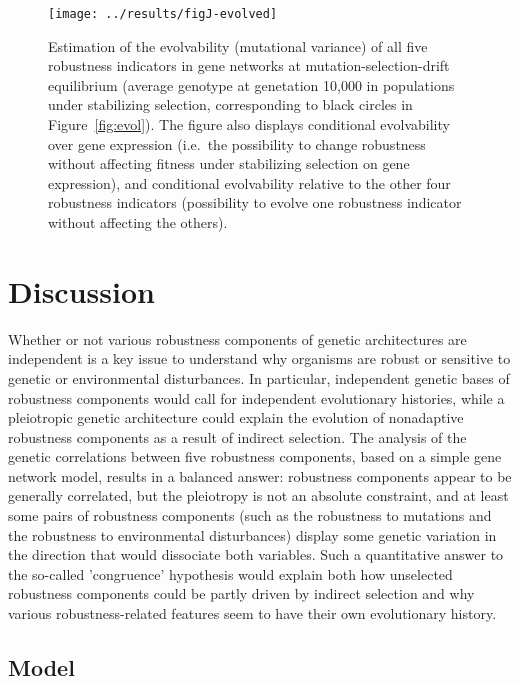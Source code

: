 \documentclass[a4paper]{article}
\begin{document}
\begin{figure}[t]
\begin{center}
\texttt{[image: ../results/figJ-evolved]}
\caption{\label{fig:evolvability} Estimation of the evolvability (mutational variance) of all five robustness indicators in gene networks at mutation-selection-drift equilibrium (average genotype at genetation 10,000 in populations under stabilizing selection, corresponding to black circles in Figure~\ref{fig:evol}). The figure also displays conditional evolvability over gene expression (i.e.\ the possibility to change robustness without affecting fitness under stabilizing selection on gene expression), and conditional evolvability relative to the other four robustness indicators (possibility to evolve one robustness indicator without affecting the others). }
\end{center}
\end{figure}


\section{Discussion}

Whether or not various robustness components of genetic architectures are independent is a key issue to understand why organisms are robust or sensitive to genetic or environmental disturbances. In particular, independent genetic bases of robustness components would call for independent evolutionary histories, while a pleiotropic genetic architecture could explain the evolution of nonadaptive robustness components as a result of indirect selection. The analysis of the genetic correlations between five robustness components, based on a simple gene network model, results in a balanced answer: robustness components appear to be generally correlated, but the pleiotropy is not an absolute constraint, and at least some pairs of robustness components (such as the robustness to mutations and the robustness to environmental disturbances) display some genetic variation in the direction that would dissociate both variables. Such a quantitative answer to the so-called 'congruence' hypothesis \citep{dHW+03} would explain both how unselected robustness components could be partly driven by indirect selection and why various robustness-related features seem to have their own evolutionary history. 

\subsection{Model}
\end{document}
